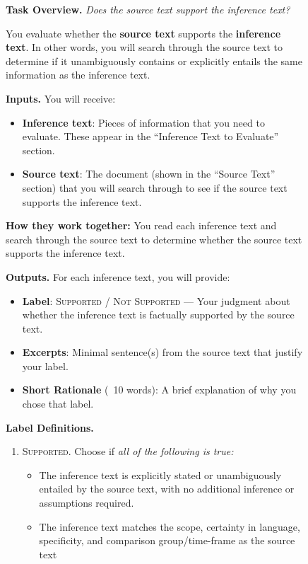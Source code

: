 \documentclass{article}
\begin{document}
\clearpage


\begin{figure}[t]
\centering
\begin{small}
\begin{tcolorbox}[colback=gray!5, colframe=black, width=\textwidth, title=\textbf{Annotation Guideline for Evaluating Factual Recall}, fonttitle=\bfseries]

\textbf{Task Overview.} \textit{Does the source text support the inference text?}\vspace{0.5em}

You evaluate whether the \textbf{source text} supports the \textbf{inference text}. In other words, you will search through the source text to determine if it unambiguously contains or explicitly entails the same information as the inference text.

\vspace{0.5em}
\textbf{Inputs.}
You will receive:
\begin{itemize}[leftmargin=0.6cm]
    \item \textbf{Inference text}: Pieces of information that you need to evaluate. These appear in the ``Inference Text to Evaluate'' section.
    \item \textbf{Source text}: The document (shown in the ``Source Text'' section) that you will search through to see if the source text supports the inference text.
\end{itemize}
\textbf{How they work together:} You read each inference text and search through the source text to determine whether the source text supports the inference text.


\vspace{0.5em}
\textbf{Outputs.}
For each inference text, you will provide:
\begin{itemize}[leftmargin=0.6cm]
    \item \textbf{Label}: \textsc{Supported} / \textsc{Not Supported} --- Your judgment about whether the inference text is factually supported by the source text.
    \item \textbf{Excerpts}: Minimal sentence(s) from the source text that justify your label.
    \item \textbf{Short Rationale} (~10 words): A brief explanation of why you chose that label.
\end{itemize}

\textbf{Label Definitions.}
\begin{enumerate}[leftmargin=0.6cm]
    \item \textsc{Supported.} Choose if \textit{all of the following is true:}
    \vspace{-0.2em}
    \begin{itemize}[leftmargin=0.5cm]
    \item The inference text is explicitly stated or unambiguously entailed by the source text, with no additional inference or assumptions required.
    \item The inference text matches the scope, certainty in language, specificity, and comparison group/time-frame as the source text
    \end{itemize}


\end{enumerate}
\end{tcolorbox}
\end{small}
\end{figure}
\end{document}
